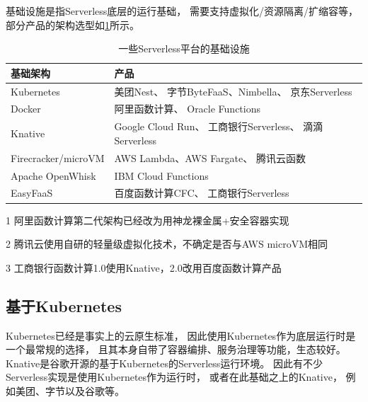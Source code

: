 基础设施是指Serverless底层的运行基础，
需要支持虚拟化/资源隔离/扩缩容等，
部分产品的架构选型如\cref{table:serverless-infras}所示。

\begin{table}[h!]
\centering
\begin{threeparttable}
    \begin{tabularx}{\textwidth}{|l|X|}
        \toprule
        \textbf{基础架构} & \textbf{产品} \\
        \midrule
        Kubernetes & 美团Nest\cite{meituan_serverless_nest, meituan_serverless_2}、
        字节ByteFaaS\cite{bytedance_faas}、Nimbella\cite{nimbella_k8s}、
        京东Serverless\cite{jd_serverless, jd_serverless_2} \\
        \hline
        Docker & 阿里函数计算\cite{aliyun_faas_arch_2}\tnote{1}、
        Oracle Functions\cite{overview_oracle_functions} \\
        \hline
        Knative & Google Cloud Run\cite{gcr_knative}、
        工商银行Serverless\cite{icbc_faas_arch}\tnote{1}、
        滴滴Serverless\cite{didi_serverless}  \\
        \hline
        Firecracker/microVM & AWS Lambda、AWS Fargate\cite{firecracker_home}、
        腾讯云函数\cite{tecent_faas_cold_start, tecent_serverless}\tnote{2} \\
        \hline
        Apache OpenWhisk & IBM Cloud Functions\cite{how_ibm_cloud_functions_works} \\
        \hline
        EasyFaaS & 百度函数计算CFC\cite{baidu_serverless_arch}、
        工商银行Serverless\cite{icbc_faas_arch} \\
        \bottomrule
    \end{tabularx}
\begin{tablenotes}
    \item[1] 阿里函数计算第二代架构已经改为用神龙裸金属+安全容器实现\cite{aliyun_faas_arch_2}
    \item[2] 腾讯云使用自研的轻量级虚拟化技术，不确定是否与AWS microVM相同
    \item[3] 工商银行函数计算1.0使用Knative，2.0改用百度函数计算产品
    \end{tablenotes}
\end{threeparttable}
\caption{一些Serverless平台的基础设施}
\label{table:serverless-infras}
\end{table}

\subsection{基于Kubernetes}
Kubernetes已经是事实上的云原生标准，
因此使用Kubernetes作为底层运行时是一个最常规的选择，
且其本身自带了容器编排、服务治理等功能，生态较好。
Knative是谷歌开源的基于Kubernetes的Serverless运行环境。
因此有不少Serverless实现是使用Kubernetes作为运行时，
或者在此基础之上的Knative，
例如美团、字节以及谷歌等。

